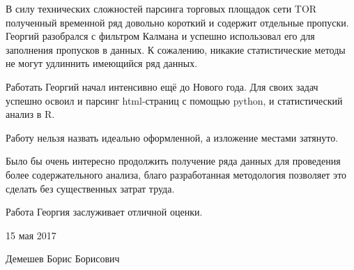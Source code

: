 \documentclass[a4paper, 12pt]{article}
\begin{document}
В силу технических сложностей парсинга торговых площадок сети TOR
полученный временной ряд довольно короткий и содержит отдельные
пропуски. Георгий разобрался с фильтром Калмана и успешно использовал
его для заполнения пропусков в данных. К сожалению, никакие
статистические методы не могут удлиннить имеющийся ряд данных.

Работать Георгий начал интенсивно ещё до Нового года. Для своих задач
успешно освоил и парсинг html-страниц с помощью python, и статистический
анализ в R.

Работу нельзя назвать идеально оформленной, а изложение местами
затянуто.

Было бы очень интересно продолжить получение ряда данных для проведения
более содержательного анализа, благо разработанная методология позволяет
это сделать без существенных затрат труда.

Работа Георгия заслуживает отличной оценки.

\vspace{1cm}

15 мая 2017

Демешев Борис Борисович
\end{document}
